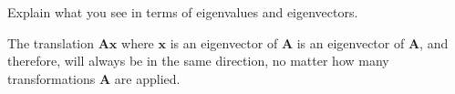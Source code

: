 Explain what you see in terms of eigenvalues and eigenvectors.

\begin{solution}
    The translation $\boldsymbol{Ax}$ where $\boldsymbol{x}$ is an eigenvector of $\boldsymbol{A}$ is an eigenvector of $\boldsymbol{A}$, and therefore, will always be in the same direction, no matter how many transformations $\boldsymbol{A}$ are applied.
\end{solution}